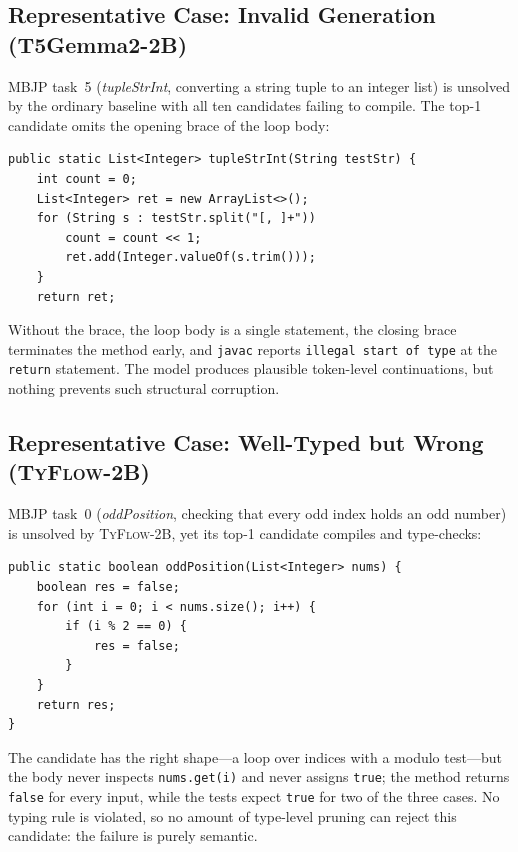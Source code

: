 \documentclass[manuscript,screen]{acmart}
\newcommand{\toolname}[1]{\textsc{#1}}
\newcommand{\mainname}{\toolname{TyFlow}\xspace}
\begin{document}
\subsection{{\color{revblue}Representative Case: Invalid Generation (T5Gemma2-2B)}}

{\color{revblue}MBJP task~5 (}\emph{\color{revblue}tupleStrInt}{\color{revblue}, converting a string tuple to an integer list) is unsolved by the ordinary baseline with all ten candidates failing to compile.
The top-1 candidate omits the opening brace of the loop body:
}\begin{tcolorbox}
\begin{Verbatim}[fontsize=\small]
public static List<Integer> tupleStrInt(String testStr) {
    int count = 0;
    List<Integer> ret = new ArrayList<>();
    for (String s : testStr.split("[, ]+"))
        count = count << 1;
        ret.add(Integer.valueOf(s.trim()));
    }
    return ret;
\end{Verbatim}
\end{tcolorbox}
{\color{revblue}Without the brace, the loop body is a single statement, the closing brace terminates the method early, and }\texttt{\color{revblue}javac} {\color{revblue}reports }\texttt{\color{revblue}illegal start of type} {\color{revblue}at the }\texttt{\color{revblue}return} {\color{revblue}statement.
The model produces plausible token-level continuations, but nothing prevents such structural corruption.
}

\subsection{{\color{revblue}Representative Case: Well-Typed but Wrong (}\mainname{\color{revblue}-2B)}}

{\color{revblue}MBJP task~0 (}\emph{\color{revblue}oddPosition}{\color{revblue}, checking that every odd index holds an odd number) is unsolved by }\mainname{\color{revblue}-2B, yet its top-1 candidate compiles and type-checks:
}\begin{tcolorbox}
\begin{Verbatim}[fontsize=\small]
public static boolean oddPosition(List<Integer> nums) {
    boolean res = false;
    for (int i = 0; i < nums.size(); i++) {
        if (i % 2 == 0) {
            res = false;
        }
    }
    return res;
}
\end{Verbatim}
\end{tcolorbox}
{\color{revblue}The candidate has the right shape---a loop over indices with a modulo test---but the body never inspects }\texttt{\color{revblue}nums.get(i)} {\color{revblue}and never assigns }\texttt{\color{revblue}true}{\color{revblue}; the method returns }\texttt{\color{revblue}false} {\color{revblue}for every input, while the tests expect }\texttt{\color{revblue}true} {\color{revblue}for two of the three cases.
No typing rule is violated, so no amount of type-level pruning can reject this candidate: the failure is purely semantic.
}
\end{document}
